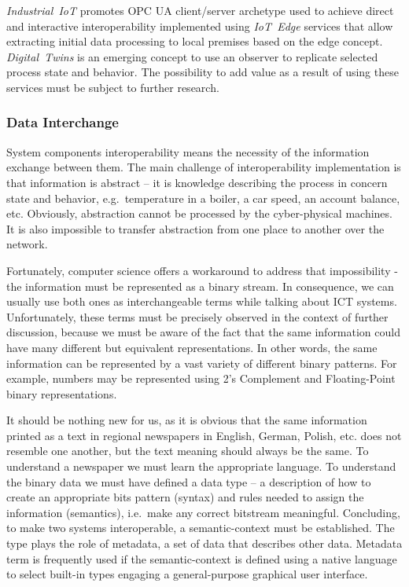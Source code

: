 \documentclass{article}
\begin{document}
\textit{Industrial\ IoT} promotes OPC UA client/server archetype used to
achieve direct and interactive interoperability implemented using
\textit{IoT\ Edge} services that allow extracting initial data
processing to local premises based on the edge concept.
\textit{Digital\ Twins} is an emerging concept to use an observer to
replicate selected process state and behavior. The possibility to add
value as a result of using these services must be subject to further
research.

\subsubsection{Data Interchange}\label{data-interchange}

System components interoperability means the necessity of the
information exchange between them. The main challenge of
interoperability implementation is that information is abstract -- it is
knowledge describing the process in concern state and behavior,
e.g.~temperature in a boiler, a car speed, an account balance, etc.
Obviously, abstraction cannot be processed by the cyber-physical
machines. It is also impossible to transfer abstraction from one place
to another over the network.

Fortunately, computer science offers a workaround to address that
impossibility - the information must be represented as a binary stream.
In consequence, we can usually use both ones as interchangeable terms
while talking about ICT systems. Unfortunately, these terms must be
precisely observed in the context of further discussion, because we must
be aware of the fact that the same information could have many different
but equivalent representations. In other words, the same information can
be represented by a vast variety of different binary patterns. For
example, numbers may be represented using 2's Complement and
Floating-Point binary representations.

It should be nothing new for us, as it is obvious that the same
information printed as a text in regional newspapers in English, German,
Polish, etc. does not resemble one another, but the text meaning should
always be the same. To understand a newspaper we must learn the
appropriate language. To understand the binary data we must have defined
a data type -- a description of how to create an appropriate bits
pattern (syntax) and rules needed to assign the information (semantics),
i.e.~make any correct bitstream meaningful. Concluding, to make two
systems interoperable, a semantic-context must be established. The type
plays the role of metadata, a set of data that describes other data.
Metadata term is frequently used if the semantic-context is defined
using a native language to select built-in types engaging a
general-purpose graphical user interface.
\end{document}
